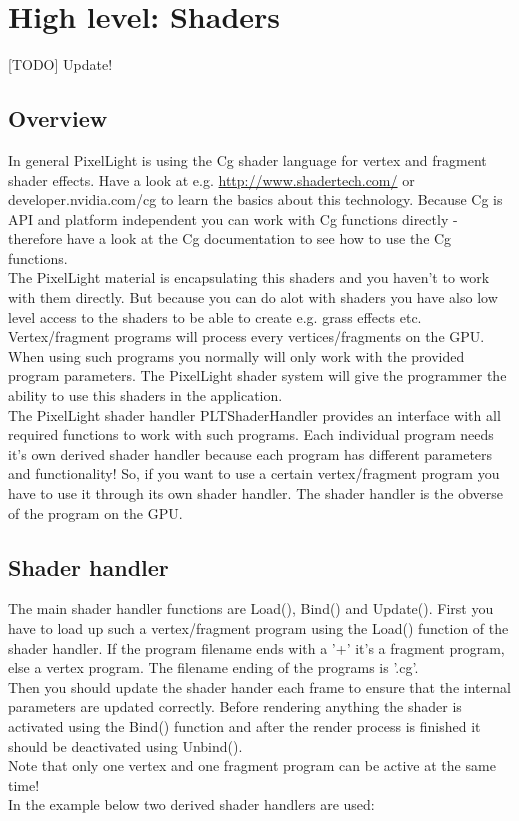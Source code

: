 \chapter{High level: Shaders}


[TODO] Update!



\section{Overview}
In general PixelLight is using the Cg shader language for vertex and fragment shader effects. Have 
a look at e.g. \url{http://www.shadertech.com/} or developer.nvidia.com/cg to learn the basics
about this technology. Because Cg is \ac{API} and platform independent you can work with Cg functions
directly - therefore have a look at the Cg documentation to see how to use the Cg functions.\\
The PixelLight material is encapsulating this shaders and you haven't to work with them directly. But
because you can do alot with shaders you have also low level access to the shaders to be able
to create e.g. grass effects etc.\\

Vertex/fragment programs will process every vertices/fragments on the \ac{GPU}. When using such programs
you normally will only work with the provided program parameters. The PixelLight shader system will give the
programmer the ability to use this shaders in the application.\\
The PixelLight shader handler PLTShaderHandler provides an interface with all required functions to work with
such programs. Each individual program needs it's own derived shader handler because each program has
different parameters and functionality! So, if you want to use a certain vertex/fragment program you
have to use it through its own shader handler. The shader handler is the obverse of the program on the \ac{GPU}.




\section{Shader handler}
The main shader handler functions are Load(), Bind() and Update(). First you have to load up such
a vertex/fragment program using the Load() function of the shader handler. If the program filename
ends with a '+' it's a fragment program, else a vertex program. The filename ending of the programs
is '.cg'.\\
Then you should update the shader hander each frame to ensure that the internal parameters are
updated correctly. Before rendering anything the shader is activated using the Bind() function and
after the render process is finished it should be deactivated using Unbind().\\
Note that only one vertex and one fragment program can be active at the same time!\\
In the example below two derived shader handlers are used:\\


